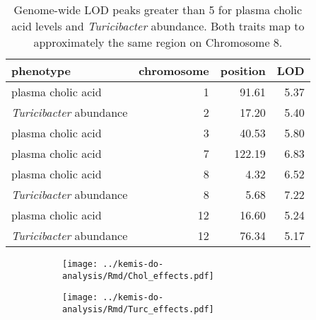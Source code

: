 \documentclass[oneside]{book}
\begin{document}

\begin{table}[ht]
\centering
\begin{tabular}{lrrr}
  \hline
phenotype & chromosome & position & LOD \\ 
  \hline
plasma cholic acid &   1 & 91.61 & 5.37 \\ 
 \emph{Turicibacter} abundance &   2 & 17.20 & 5.40 \\ 
  plasma cholic acid &   3 & 40.53 & 5.80 \\ 
  plasma cholic acid &   7 & 122.19 & 6.83 \\ 
  plasma cholic acid &   8 & 4.32 & 6.52 \\ 
 \emph{Turicibacter} abundance &   8 & 5.68 & 7.22 \\ 
  plasma cholic acid &  12 & 16.60 & 5.24 \\ 
 \emph{Turicibacter} abundance &  12 & 76.34 & 5.17 \\ 
   \hline
\end{tabular}
\caption{\label{tab:3c-lod-peaks}Genome-wide LOD peaks greater than 5 for plasma cholic acid levels and \emph{Turicibacter} abundance. Both traits map to approximately the same region on Chromosome 8.}
\end{table}

\begin{figure}

\begin{subfigure}[b]{\textwidth}
\centering
\texttt{[image: ../kemis-do-analysis/Rmd/Chol\_effects.pdf]}
\subcaption{}
\end{subfigure}

\begin{subfigure}[b]{\textwidth}
\centering
\texttt{[image: ../kemis-do-analysis/Rmd/Turc\_effects.pdf]}
\subcaption{}
\end{subfigure}
\caption{}
\end{figure}



\end{document}
